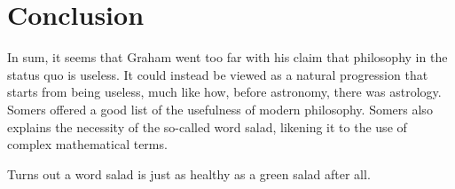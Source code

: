 \documentclass[12pt]{article}
\begin{document}
\section{Conclusion}

In sum, it seems that Graham went too far with his claim that philosophy in the status quo is useless. It could instead be viewed as a natural progression that starts from being useless, much like how, before astronomy, there was astrology. Somers offered a good list of the usefulness of modern philosophy. Somers also explains the necessity of the so-called word salad, likening it to the use of complex mathematical terms.

Turns out a word salad is just as healthy as a green salad after all.

\end{document}
